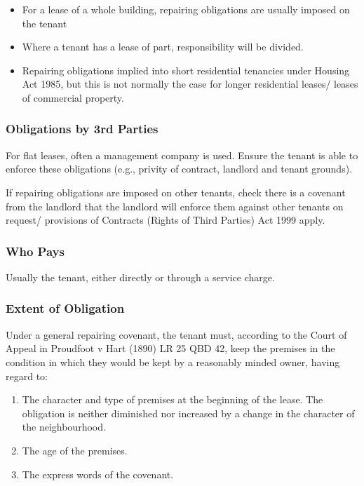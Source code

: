 \documentclass[
]{article}
\providecommand{\tightlist}{%
  \setlength{\itemsep}{0pt}\setlength{\parskip}{0pt}}
\begin{document}
\begin{itemize}
\tightlist
\item
  For a lease of a whole building, repairing obligations are usually
  imposed on the tenant
\item
  Where a tenant has a lease of part, responsibility will be divided.
\item
  Repairing obligations implied into short residential tenancies under
  Housing Act 1985, but this is not normally the case for longer
  residential leases/ leases of commercial property.
\end{itemize}

\hypertarget{obligations-by-3rd-parties}{%
\subsubsection{Obligations by 3rd
Parties}\label{obligations-by-3rd-parties}}

For flat leases, often a management company is used. Ensure the tenant
is able to enforce these obligations (e.g., privity of contract,
landlord and tenant grounds).

If repairing obligations are imposed on other tenants, check there is a
covenant from the landlord that the landlord will enforce them against
other tenants on request/ provisions of Contracts (Rights of Third
Parties) Act 1999 apply.

\hypertarget{who-pays}{%
\subsubsection{Who Pays}\label{who-pays}}

Usually the tenant, either directly or through a service charge.

\hypertarget{extent-of-obligation}{%
\subsubsection{Extent of Obligation}\label{extent-of-obligation}}

Under a general repairing covenant, the tenant must, according to the
Court of Appeal in Proudfoot v Hart (1890) LR 25 QBD 42, keep the
premises in the condition in which they would be kept by a reasonably
minded owner, having regard to:

\begin{enumerate}
\tightlist
\item
  The character and type of premises at the beginning of the lease. The
  obligation is neither diminished nor increased by a change in the
  character of the neighbourhood.
\item
  The age of the premises.
\item
  The express words of the covenant.
\end{enumerate}
\end{document}

